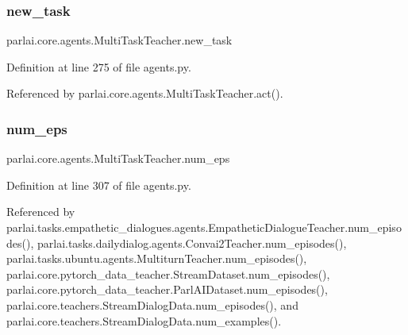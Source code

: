 \mbox{\label{classparlai_1_1core_1_1agents_1_1MultiTaskTeacher_a3a4f918f0ae0014eaae5cd2c6b14bc2e}} 
\subsubsection{\texorpdfstring{new\+\_\+task}{new\_task}}
{\footnotesize\ttfamily parlai.\+core.\+agents.\+Multi\+Task\+Teacher.\+new\+\_\+task}



Definition at line 275 of file agents.\+py.



Referenced by parlai.\+core.\+agents.\+Multi\+Task\+Teacher.\+act().

\mbox{\label{classparlai_1_1core_1_1agents_1_1MultiTaskTeacher_ad3cdb9945ee238eff22fcbf5be5dfb16}} 
\subsubsection{\texorpdfstring{num\+\_\+eps}{num\_eps}}
{\footnotesize\ttfamily parlai.\+core.\+agents.\+Multi\+Task\+Teacher.\+num\+\_\+eps}



Definition at line 307 of file agents.\+py.



Referenced by parlai.\+tasks.\+empathetic\+\_\+dialogues.\+agents.\+Empathetic\+Dialogue\+Teacher.\+num\+\_\+episodes(), parlai.\+tasks.\+dailydialog.\+agents.\+Convai2\+Teacher.\+num\+\_\+episodes(), parlai.\+tasks.\+ubuntu.\+agents.\+Multiturn\+Teacher.\+num\+\_\+episodes(), parlai.\+core.\+pytorch\+\_\+data\+\_\+teacher.\+Stream\+Dataset.\+num\+\_\+episodes(), parlai.\+core.\+pytorch\+\_\+data\+\_\+teacher.\+Parl\+A\+I\+Dataset.\+num\+\_\+episodes(), parlai.\+core.\+teachers.\+Stream\+Dialog\+Data.\+num\+\_\+episodes(), and parlai.\+core.\+teachers.\+Stream\+Dialog\+Data.\+num\+\_\+examples().

